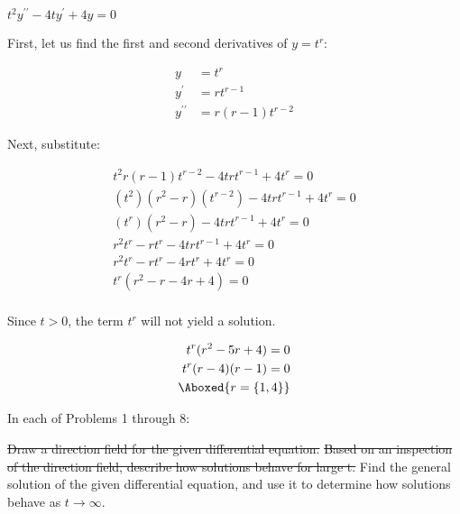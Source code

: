 \documentclass{lapchomework}
\begin{document}
\begin{problems}

\problem[15] $t^2y^{\prime\prime}-4ty^{\prime}+4y=0$

\begin{solution}

\step First, let us find the first and second derivatives of $y = t^r$:

\step \begin{align*}
y & = t^r \\
y^{\prime} & = rt^{r-1} \\
y^{\prime\prime} & = r(r-1)t^{r-2}
\end{align*}

\step Next, substitute:

\step \begin{align*}
t^2r(r-1)t^{r-2} - 4trt^{r-1} + 4t^r=0 \\
(t^2)(r^2 - r)(t^{r-2}) - 4trt^{r-1} + 4t^r = 0 \\
(t^r)(r^2 - r) - 4trt^{r-1} + 4t^r = 0 \\
r^2t^r - rt^r - 4trt^{r-1} + 4t^r = 0 \\
r^2t^r - rt^r - 4rt^r + 4t^r = 0 \\
t^r(r^2 - r - 4r + 4) = 0 \\
\end{align*}

\step Since $t > 0$, the term $t^r$ will not yield a solution.

\step \begin{align*}
t^r(r^2 - 5r + 4) = 0 \\
t^r(r - 4)(r - 1) = 0 \\
\Aboxed{r = \{1, 4\}}
\end{align*}

\end{solution}

\end{problems}


\begin{instructions}
In each of Problems 1 through 8:
\begin{subinstructions}
\subinstruction \sout{Draw a direction field for the given differential 
equation.}
\subinstruction \sout{Based on an inspection of the direction field, describe 
how solutions behave for large t.}
\subinstruction Find the general solution of the given differential equation,
and use it to determine how solutions behave as $t \to \infty$.
\end{subinstructions}
\end{instructions}
\end{document}
